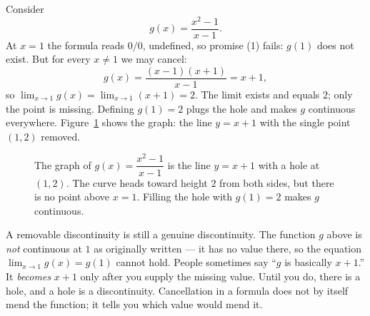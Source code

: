 \begin{example}
\label{ch08:ex-hole}
Consider
\[
  g(x)=\frac{x^2-1}{x-1}.
\]
At $x=1$ the formula reads $0/0$, undefined, so promise (1) fails: $g(1)$ does not exist.
But for every $x\ne 1$ we may cancel:
\[
  g(x)=\frac{(x-1)(x+1)}{x-1}=x+1,
\]
so $\lim_{x\to 1} g(x)=\lim_{x\to 1}(x+1)=2$. The limit exists and equals $2$; only the
point is missing. Defining $g(1)=2$ plugs the hole and makes $g$ continuous everywhere.
Figure~\ref{ch08:fig-hole} shows the graph: the line $y=x+1$ with the single point $(1,2)$
removed.
\end{example}

\begin{figure}[htbp]
\centering
{}
\caption{The graph of $g(x)=\dfrac{x^2-1}{x-1}$ is the line $y=x+1$ with a hole at
$(1,2)$. The curve heads toward height $2$ from both sides, but there is no point above
$x=1$. Filling the hole with $g(1)=2$ makes $g$ continuous.}
\label{ch08:fig-hole}
\end{figure}

\begin{trapbox}
A removable discontinuity is still a genuine discontinuity. The function $g$ above is
\emph{not} continuous at $1$ as originally written --- it has no value there, so the
equation $\lim_{x\to 1}g(x)=g(1)$ cannot hold. People sometimes say ``$g$ is basically
$x+1$.'' It \emph{becomes} $x+1$ only after you supply the missing value. Until you do,
there is a hole, and a hole is a discontinuity. Cancellation in a formula does not by
itself mend the function; it tells you which value would mend it.
\end{trapbox}

